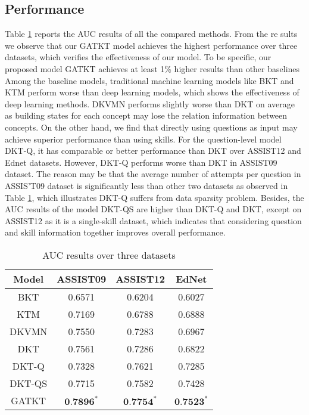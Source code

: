 \subsection{Performance}
Table \ref{ch2-tb2} reports the AUC results of all the compared methods. From the re sults we observe that our GATKT model achieves the highest performance over three datasets, which verifies the effectiveness of our model. To be specific, our proposed model GATKT achieves at least 1\% higher results than other baselines Among the baseline models, traditional machine learning models like BKT and KTM perform worse than deep learning models, which shows the effectiveness of deep learning methods. DKVMN performs slightly worse than DKT on average as building states for each concept may lose the relation information between concepts. On the other hand, we find that directly using questions as input may achieve superior performance than using skills. For the question-level model DKT-Q, it has comparable or better performance than DKT over ASSIST12 and Ednet datasets. However, DKT-Q performs worse than DKT in ASSIST09 dataset. The reason may be that the average number of attempts per question in ASSIS'T09 dataset is significantly less than other two datasets as observed in Table \ref{ch2-tb2}, which illustrates DKT-Q suffers from data sparsity problem. Besides, the AUC results of the model DKT-QS are higher than DKT-Q and DKT, except on ASSIST12 as it is a single-skill dataset, which indicates that considering question and skill information together improves overall performance.

\begin{table}[h]
	\centering
	\caption{AUC results over three datasets}
	\label{ch2-tb2}
	\begin{tabular}{cccc}
		\hline Model & ASSIST09                   & ASSIST12                   & EdNet                      \\
		\hline BKT   & 0.6571                     & 0.6204                     & 0.6027                     \\
		KTM          & 0.7169                     & 0.6788                     & 0.6888                     \\
		DKVMN        & 0.7550                     & 0.7283                     & 0.6967                     \\
		DKT          & 0.7561                     & 0.7286                     & 0.6822                     \\
		\hline DKT-Q & 0.7328                     & 0.7621                     & 0.7285                     \\
		DKT-QS       & 0.7715                     & 0.7582                     & 0.7428                     \\
		\hline GATKT & $\mathbf{0 . 7 8 9 6}^{*}$ & $\mathbf{0 . 7 7 5 4}^{*}$ & $\mathbf{0 . 7 5 2 3}^{*}$ \\
		\hline
	\end{tabular}
\end{table}




